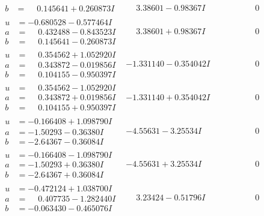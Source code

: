 \documentclass[1p]{elsarticle_modified}
\theoremstyle{definition}
\begin{document}
$$\begin{array}{c|c|c}
\begin{aligned}
b &= \phantom{-}0.145641 + 0.260873 I\end{aligned}
 & \phantom{-}3.38601 - 0.98367 I & \phantom{-0.000000 } 0 \\ \hline\begin{aligned}
u &= -0.680528 - 0.577464 I \\
a &= \phantom{-}0.432488 - 0.843523 I \\
b &= \phantom{-}0.145641 - 0.260873 I\end{aligned}
 & \phantom{-}3.38601 + 0.98367 I & \phantom{-0.000000 } 0 \\ \hline\begin{aligned}
u &= \phantom{-}0.354562 + 1.052920 I \\
a &= \phantom{-}0.343872 - 0.019856 I \\
b &= \phantom{-}0.104155 - 0.950397 I\end{aligned}
 & -1.331140 - 0.354042 I & \phantom{-0.000000 } 0 \\ \hline\begin{aligned}
u &= \phantom{-}0.354562 - 1.052920 I \\
a &= \phantom{-}0.343872 + 0.019856 I \\
b &= \phantom{-}0.104155 + 0.950397 I\end{aligned}
 & -1.331140 + 0.354042 I & \phantom{-0.000000 } 0 \\ \hline\begin{aligned}
u &= -0.166408 + 1.098790 I \\
a &= -1.50293 - 0.36380 I \\
b &= -2.64367 - 0.36084 I\end{aligned}
 & -4.55631 - 3.25534 I & \phantom{-0.000000 } 0 \\ \hline\begin{aligned}
u &= -0.166408 - 1.098790 I \\
a &= -1.50293 + 0.36380 I \\
b &= -2.64367 + 0.36084 I\end{aligned}
 & -4.55631 + 3.25534 I & \phantom{-0.000000 } 0 \\ \hline\begin{aligned}
u &= -0.472124 + 1.038700 I \\
a &= \phantom{-}0.407735 - 1.282440 I \\
b &= -0.063430 - 0.465076 I\end{aligned}
 & \phantom{-}3.23424 - 0.51796 I & \phantom{-0.000000 } 0 \\ \hline\begin{aligned}

\end{aligned}
\end{array}$$
\end{document}
